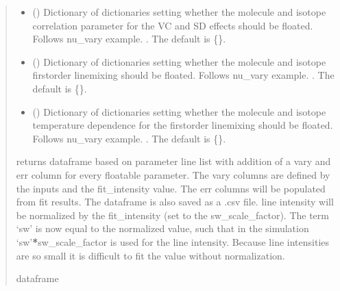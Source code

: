 \documentclass[letterpaper,10pt,english]{sphinxmanual}
\begin{document}
\begin{fulllineitems}
\begin{fulllineitems}
\begin{quote}
\begin{description}
\begin{itemize}
\item {} 
\sphinxAtStartPar
{} (\sphinxstyleliteralemphasis{\sphinxupquote{, }}) \textendash{} Dictionary of dictionaries setting whether the molecule and isotope correlation parameter for the VC and SD effects should be floated.  Follows nu\_vary example.  . The default is \{\}.

\item {} 
\sphinxAtStartPar
{} (\sphinxstyleliteralemphasis{\sphinxupquote{, }}) \textendash{} Dictionary of dictionaries setting whether the molecule and isotope first\sphinxhyphen{}order line\sphinxhyphen{}mixing should be floated.  Follows nu\_vary example.  . The default is \{\}.

\item {} 
\sphinxAtStartPar
{} (\sphinxstyleliteralemphasis{\sphinxupquote{, }}) \textendash{} Dictionary of dictionaries setting whether the molecule and isotope temperature dependence for the first\sphinxhyphen{}order line\sphinxhyphen{}mixing should be floated.  Follows nu\_vary example.  . The default is \{\}.

\end{itemize}

\sphinxAtStartPar
{} \textendash{} returns dataframe based on parameter line list with addition of a vary and err column for every floatable parameter.  The vary columns are defined by the inputs and the fit\_intensity value.  The err columns will be populated from fit results.  The dataframe is also saved as a .csv file.  line intensity will be normalized by the fit\_intensity (set to the sw\_scale\_factor). The term ‘sw’ is now equal to the normalized value, such that in the simulation ‘sw’{\color{red}\bfseries{}*}sw\_scale\_factor is used for the line intensity. Because line intensities are so small it is difficult to fit the value without normalization.

\sphinxAtStartPar
dataframe

\end{description}\end{quote}


\end{fulllineitems}
\end{fulllineitems}
\end{document}
